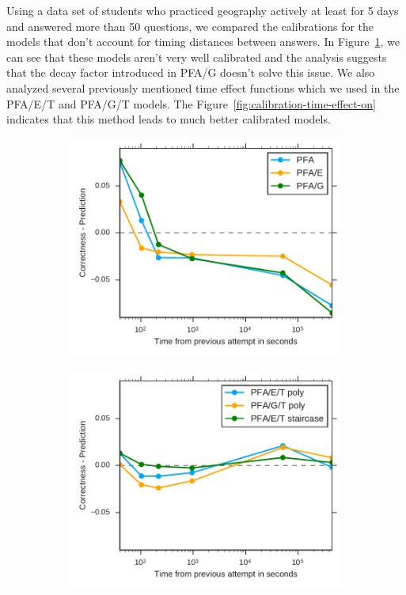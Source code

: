 Using a data set of students who practiced geography actively at least for 5 days and answered more than 50 questions, we compared the calibrations for the models that don't account for timing distances between answers. In Figure~\ref{fig:calibration-time-effect-off}, we can see that these models aren't very well calibrated and the analysis suggests that the decay factor introduced in PFA/G doesn't solve this issue. We also analyzed several previously mentioned time effect functions which we used in the PFA/E/T and PFA/G/T models. The Figure~\ref{fig:calibration-time-effect-on} indicates that this method leads to much better calibrated models.

\begin{figure}[htbp]
  \centering
  \begin{subfigure}{.49\textwidth}
    \centering
    \includegraphics[width=\textwidth]{img/calibration-time-effect-off}
    \caption{}
    \label{fig:calibration-time-effect-off}
  \end{subfigure}
  \begin{subfigure}{.49\textwidth}
    \centering
    \includegraphics[width=\textwidth]{img/calibration-time-effect-on}

\end{subfigure}
\end{figure}
